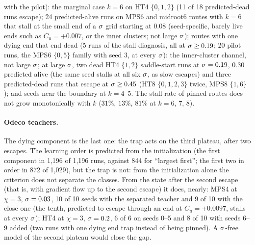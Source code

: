 with the pilot): the marginal case $k=6$ on HT4 $\{0,1,2\}$ (11 of 18 predicted-dead runs escape); 24 predicted-alive runs on MPS6 and
midroot6 routes with $k=6$ that stall at the small end of a $\sigma$ grid starting at $0.08$ (seed-specific, barely live
ends such as $C_u=+0.007$, or the inner clusters; not large $\sigma$); routes with one dying end that end dead (5 runs of
the stall diagnosis, all at $\sigma\ge0.19$; 20 pilot runs, the MPS6 $\{0,5\}$ family with seed 3, at every $\sigma$): the
inner-cluster channel, not large $\sigma$; at large $\sigma$, two dead HT4 $\{1,2\}$ saddle-start runs at $\sigma=0.19$,
$0.30$ predicted alive (the same seed stalls at all six $\sigma$, as slow escapes) and three predicted-dead runs that
escape at $\sigma\ge0.45$ (HT8 $\{0,1,2,3\}$ twice, MPS8 $\{1,6\}$); and seeds near the boundary at $k=4$--$5$. The stall rate of
pinned routes does not grow monotonically with $k$ ($31\%$, $13\%$, $81\%$ at $k=6$, $7$, $8$).

\paragraph{Odeco teachers.}
\empirical{} The dying component is the last one: the trap acts on the third plateau, after two escapes. The learning
order is predicted from the initialization (the first component in 1,196 of 1,196 runs, against 844 for ``largest
first''; the first two in order in 872 of 1,029), but the trap is not: from the initialization alone the criterion
does not separate the classes. From the state after the second escape (that is, with gradient flow up to the second
escape) it does, nearly: MPS4 at $\chi=3$, $\sigma=0.03$, 10 of 10 seeds with the separated teacher and 9 of 10 with the
close one (the tenth, predicted to escape through an end at $C_u=+0.0097$, stalls at every $\sigma$); HT4 at $\chi=3$,
$\sigma=0.2$, 6 of 6 on seeds 0--5 and 8 of 10 with seeds 6--9 added (two runs with one dying end trap instead of being
pinned). A $\sigma$-free model of the second plateau would close the gap.

